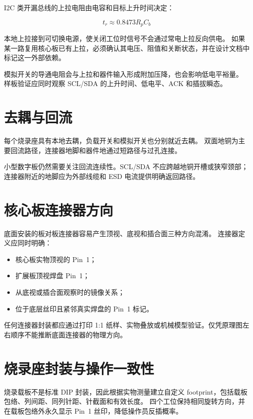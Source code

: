 I2C 类开漏总线的上拉电阻由电容和目标上升时间决定：

\begin{equation}
  t_r \approx 0.8473 R_p C_b
\end{equation}

本地上拉接到可切换电源，使关闭工位时信号不会通过常电上拉反向供电。
如果某一路复用核心板已有上拉，必须确认其电压、阻值和关断状态，并在设计文档中标记这一外部依赖。

模拟开关的导通电阻会与上拉和器件输入形成附加压降，也会影响低电平裕量。
样板验证应同时观察 SCL/SDA 的上升时间、低电平、ACK 和插拔瞬态。

\section{去耦与回流}

每个烧录座具有本地去耦，负载开关和模拟开关也分别就近去耦。
双面地铜为主要回流路径，连接器地脚和器件地通过短路径与过孔连接。

小型数字板仍然需要关注回流连续性。SCL/SDA 不应跨越地铜开槽或狭窄颈部；连接器附近的地脚应为外部线缆和 ESD 电流提供明确返回路径。

\section{核心板连接器方向}

底面安装的板对板连接器容易产生顶视、底视和插合面三种方向混淆。
连接器定义应同时明确：
\begin{itemize}
  \item 核心板实物顶视的 Pin~1；
  \item 扩展板顶视焊盘 Pin~1；
  \item 从底视或插合面观察时的镜像关系；
  \item 位于底层丝印且紧邻真实焊盘的 Pin~1 标记。
\end{itemize}

任何连接器封装都应通过打印 1:1 纸样、实物叠放或机械模型验证。仅凭原理图左右顺序不能推断底面连接器的物理方向。

\section{烧录座封装与操作一致性}

烧录载板不是标准 DIP 封装，因此根据实物测量建立自定义 footprint，包括载板包络、列间距、同列针距、针截面和有效长度。
四个工位保持相同旋转方向，并在载板包络外永久显示 Pin~1 丝印，降低操作员反插概率。

